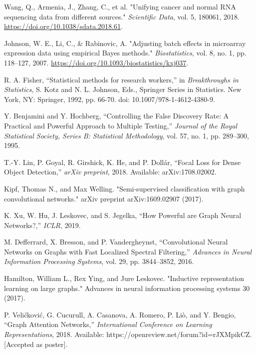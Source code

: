 \documentclass[conference]{IEEEtran}
\begin{document}
\begin{thebibliography}{99}
Wang, Q., Armenia, J., Zhang, C., et al. "Unifying cancer and normal RNA sequencing data from different sources." \textit{Scientific Data}, vol. 5, 180061, 2018. \url{https://doi.org/10.1038/sdata.2018.61}.

Johnson, W. E., Li, C., \& Rabinovic, A. "Adjusting batch effects in microarray expression data using empirical Bayes methods." \textit{Biostatistics}, vol. 8, no. 1, pp. 118–127, 2007. \url{https://doi.org/10.1093/biostatistics/kxj037}.


R. A. Fisher, ``Statistical methods for research workers,'' in \textit{Breakthroughs in Statistics}, S. Kotz and N. L. Johnson, Eds., Springer Series in Statistics. New York, NY: Springer, 1992, pp. 66-70. doi: 10.1007/978-1-4612-4380-9.

Y. Benjamini and Y. Hochberg, ``Controlling the False Discovery Rate: A Practical and Powerful Approach to Multiple Testing,'' \textit{Journal of the Royal Statistical Society, Series B: Statistical Methodology}, vol. 57, no. 1, pp. 289--300, 1995.


T.-Y. Lin, P. Goyal, R. Girshick, K. He, and P. Dollár, ``Focal Loss for Dense Object Detection,'' \textit{arXiv preprint}, 2018. Available: arXiv:1708.02002.



Kipf, Thomas N., and Max Welling. "Semi-supervised classification with graph convolutional networks." arXiv preprint arXiv:1609.02907 (2017).


K. Xu, W. Hu, J. Leskovec, and S. Jegelka, ``How Powerful are Graph Neural Networks?,'' \textit{ICLR}, 2019.

M. Defferrard, X. Bresson, and P. Vandergheynst, ``Convolutional Neural Networks on Graphs with Fast Localized Spectral Filtering,'' \textit{Advances in Neural Information Processing Systems}, vol. 29, pp. 3844--3852, 2016.

Hamilton, William L., Rex Ying, and Jure Leskovec. "Inductive representation learning on large graphs." Advances in neural information processing systems 30 (2017).

P. Veličković, G. Cucurull, A. Casanova, A. Romero, P. Liò, and Y. Bengio, ``Graph Attention Networks,'' \textit{International Conference on Learning Representations}, 2018. Available: https://openreview.net/forum?id=rJXMpikCZ. [Accepted as poster].


\end{thebibliography}
\end{document}
